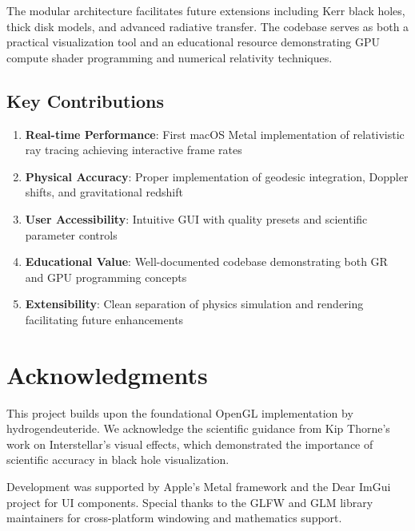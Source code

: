 \documentclass[12pt,a4paper]{article}
\theoremstyle{definition}
\theoremstyle{remark}
\begin{document}
The modular architecture facilitates future extensions including Kerr black holes, thick disk models, and advanced radiative transfer. The codebase serves as both a practical visualization tool and an educational resource demonstrating GPU compute shader programming and numerical relativity techniques.

\subsection{Key Contributions}

\begin{enumerate}
    \item \textbf{Real-time Performance}: First macOS Metal implementation of relativistic ray tracing achieving interactive frame rates
    \item \textbf{Physical Accuracy}: Proper implementation of geodesic integration, Doppler shifts, and gravitational redshift
    \item \textbf{User Accessibility}: Intuitive GUI with quality presets and scientific parameter controls
    \item \textbf{Educational Value}: Well-documented codebase demonstrating both GR and GPU programming concepts
    \item \textbf{Extensibility}: Clean separation of physics simulation and rendering facilitating future enhancements
\end{enumerate}

\section*{Acknowledgments}

This project builds upon the foundational OpenGL implementation by hydrogendeuteride. We acknowledge the scientific guidance from Kip Thorne's work on Interstellar's visual effects, which demonstrated the importance of scientific accuracy in black hole visualization.

Development was supported by Apple's Metal framework and the Dear ImGui project for UI components. Special thanks to the GLFW and GLM library maintainers for cross-platform windowing and mathematics support.
\end{document}
